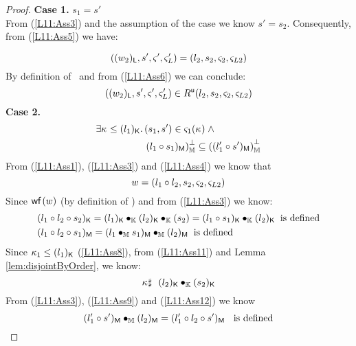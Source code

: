 \begin{lemma}[]
\begin{proof}
\noindent\textbf{Case 1.} $s_1 = s'$\\
From (\ref{L11:Ass3}) and the assumption of the case we know $s' = s_2$. Consequently, from (\ref{L11:Ass5}) we have:

\begin{equation}
	((w_2)_{\textsf{L}}, s', \varsigma_{}', \varsigma_{L}') = (l_2, s_2, \varsigma_{2}, \varsigma_{L2}) \label{L11:Ass6}
\end{equation}
%
By definition of \updateR\ and from (\ref{L11:Ass6}) we can conclude:
%
\begin{equation}
	((w_2)_{\textsf{L}}, s', \varsigma_{}', \varsigma_{L}') \in R^{\textsf{u}}(l_2, s_2, \varsigma_{2}, \varsigma_{L2}) \label{L11:Ass7}
\end{equation}
%
\textbf{Case 2.} 
%
\begin{align}
	\exists \kappa_{} \leq (l_1)_{\textsf{K}}.\, & (s_1, s') \in \varsigma_{1}(\kappa_{}) \label{L11:Ass8} \;\land\\
	&\left( l_1 \circ s_1)_{\textsf{M}}\right)_{\mathbb{M}}^{\bot} \subseteq \left( (l'_1 \circ s')_{\textsf{M}}\right)_{\mathbb{M}}^{\bot} \label{L11:Ass9}
\end{align}
%
From (\ref{L11:Ass1}), (\ref{L11:Ass3}) and (\ref{L11:Ass4}) we know that 
%
\begin{equation}
	w = (l_1 \circ l_2, s_2, \varsigma_{2}, \varsigma_{L2}) \label{L11:Ass10}
\end{equation}
%
Since $\textsf{wf}\left( w \right)$ (by definition of \Worlds) and from (\ref{L11:Ass3}) we know:
\begin{align}
	&\capPart{(l_1 \composeL l_2 \composeL s_2)} = \capPart{(l_1)} \composeCap \capPart{(l_2)} \composeCap {(s_2)} = \capPart{(l_1 \composeL s_1)} \composeCap \capPart{(l_2)}\hspace*{0.2cm} \text{is defined} \label{L11:Ass11}\\
%	
	&\heapPart{(l_1 \composeL l_2 \composeL s_1)} = \heapPart{(l_1 \composeH s_1)} \composeH \heapPart{(l_2)}  \hspace*{0.2cm} \text{is defined} \label{L11:Ass12}
\end{align}
%
Since $\kappa_{1} \leq (l_1)_{\textsf{K}}$ (\ref{L11:Ass8}), from (\ref{L11:Ass11}) and Lemma \ref{lem:disjointByOrder}, we know:
%
\begin{equation}
	\kappa_{} \sharp\ \ (l_2)_{\textsf{K}} \bullet_{\mathbb{K}} (s_2)_{\textsf{K}} \label{L11:Ass13}
\end{equation}
%
From (\ref{L11:Ass3}), (\ref{L11:Ass9}) and (\ref{L11:Ass12}) we know
%
\begin{equation}
	\heapPart{(l'_1 \composeL s')} \composeH \heapPart{(l_2)} = \heapPart{(l'_1 \composeL l_2 \composeL s')}\hspace*{0.2cm}\text{ is defined} \label{L11:Ass14}

\end{equation}
\end{proof}
\end{lemma}
